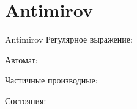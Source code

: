 \section{Antimirov}
\begin{frame}{Antimirov}
	Регулярное выражение:

	Автомат:


	Частичные производные:


	Состояния:


\end{frame}


